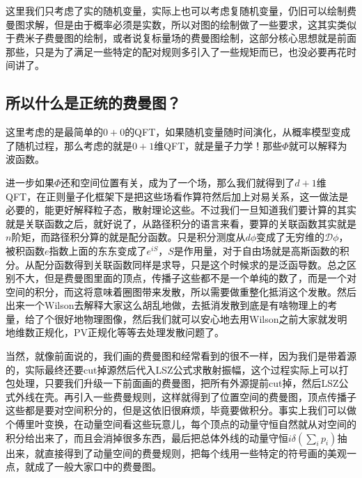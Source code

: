 这里我们只考虑了实的随机变量，实际上也可以考虑复随机变量，仍旧可以绘制费曼图求解，但是由于概率必须是实数，所以对图的绘制做了一些要求，这其实类似于费米子费曼图的绘制，或者说复标量场的费曼图绘制，这部分核心思想就是前面那些，只是为了满足一些特定的配对规则多引入了一些规矩而已，也没必要再花时间讲了。

\subsection{所以什么是正统的费曼图？}
	这里考虑的是最简单的$0+0$的QFT，如果随机变量随时间演化，从概率模型变成了随机过程，那么考虑的就是$0+1$维QFT，就是量子力学！那些$\Phi$就可以解释为波函数。
	
	进一步如果$\Phi$还和空间位置有关，成为了一个场，那么我们就得到了$d+1$维QFT，在正则量子化框架下是把这些场看作算符然后加上对易关系，这一做法是必要的，能更好解释粒子态，散射理论这些。不过我们一旦知道我们要计算的其实就是关联函数之后，就好说了，从路径积分的语言来看，要算的关联函数其实就是$n$阶矩，而路径积分算的就是配分函数。只是积分测度从$d\phi$变成了无穷维的$\mathcal{D} \phi$，被积函数$e$指数上面的东东变成了$e^{iS}$，$S$是作用量，对于自由场就是高斯函数的积分。从配分函数得到关联函数同样是求导，只是这个时候求的是泛函导数。总之区别不大，但是费曼图里面的顶点，传播子这些都不是一个单纯的数了，而是一个对空间的积分，而这将意味着圈图带来发散，所以需要做重整化抵消这个发散。然后出来一个Wilson去解释大家这么胡乱地做，去抵消发散到底是有啥物理上的考量，给了个很好地物理图像，然后我们就可以安心地去用Wilson之前大家就发明地维数正规化，PV正规化等等去处理发散问题了。
	
	当然，就像前面说的，我们画的费曼图和经常看到的很不一样，因为我们是带着源的，实际最终还要cut掉源然后代入LSZ公式求散射振幅，这个过程实际上可以打包处理，只要我们升级一下前面画的费曼图，把所有外源提前cut掉，然后LSZ公式外线在壳。再引入一些费曼规则，这样就得到了位置空间的费曼图，顶点传播子这些都是要对空间积分的，但是这依旧很麻烦，毕竟要做积分。事实上我们可以做个傅里叶变换，在动量空间看这些玩意儿，每个顶点的动量守恒自然就从对空间的积分给出来了，而且会消掉很多东西，最后把总体外线的动量守恒$i\delta\left(\sum_i p_i\right)$抽出来，就直接得到了动量空间的费曼规则，把每个线用一些特定的符号画的美观一点，就成了一般大家口中的费曼图。
	
